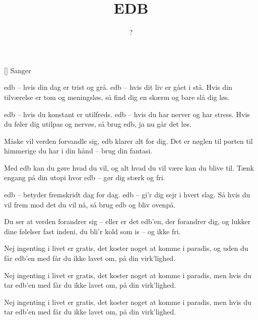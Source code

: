 \documentclass[a4paper,11pt]{article}
\title{EDB}
\author{?}
\begin{document}
\maketitle

\begin{roles}
[] Sanger
\end{roles}

\begin{song}

     edb -- hvis din dag er trist og grå.
              edb -- hvis dit liv er gået i stå.
              Hvis din tilværelse er tom og meningsløs,
              så find dig en skærm og bare slå dig løs.

     edb -- hvis du konstant er utilfreds.
              edb -- hvis du har nerver og har stress.
              Hvis du føler dig utilpas og nervøs,
              så brug edb, ja nu går det løs.

     Måske vil verden forvandle sig,
              edb klarer alt for dig.
              Det er nøglen til porten til himmerige
              du har i din hånd -- brug din fantasi.

     Med edb kan du gøre hvad du vil,
              og alt hvad du vil være kan du blive til.
              Tænk engang på din utopi
              hvor edb -- gør dig stærk og fri.

     edb -- betyder fremskridt dag for dag.
              edb -- gi'r dig sejr i hvert slag.
              Så hvis du vil frem mod det du vil nå,
              så brug edb og bliv ovenpå.

     Du ser at verden forandrer sig --
              eller er det edb'en, der forandrer dig,
              og lukker dine følelser fast indeni,
              du bli'r kold som is -- og ikke fri.

     Nej ingenting i livet er gratis,
              det koster noget at komme i paradis,
              og uden du får edb'en med
              får du ikke lavet om, på din virk'lighed.

     Nej ingenting i livet er gratis,
              det koster noget at komme i paradis,
              men hvis du tar edb'en med
              får du ikke lavet om, på din virk'lighed.

     Nej ingenting i livet er gratis,
              det koster noget at komme i paradis,
              men hvis du tar edb'en med
              får du ikke lavet om, på din virk'lighed.
\end{song}
\end{document}
